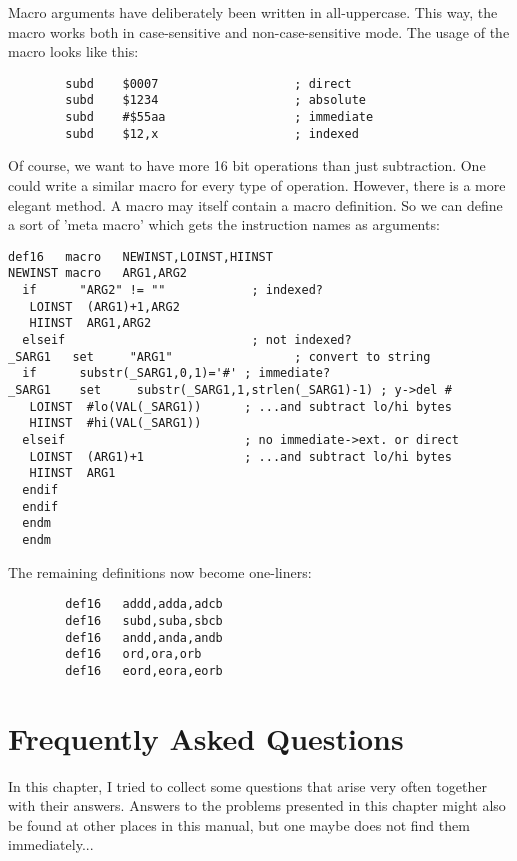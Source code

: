 \documentclass[12pt,twoside]{report}
\begin{document}
Macro arguments have deliberately been written in all-uppercase.  This way,
the macro works both in case-sensitive and non-case-sensitive mode.  The
usage of the macro looks like this:
\begin{verbatim}
        subd    $0007                   ; direct
        subd    $1234                   ; absolute
        subd    #$55aa                  ; immediate
        subd    $12,x                   ; indexed
\end{verbatim}
Of course, we want to have more 16 bit operations than just subtraction.  One
could write a similar macro for every type of operation. However, there is a
more elegant method.  A macro may itself contain a macro definition.  So we
can define a sort of 'meta macro' which gets the instruction names as arguments:
\begin{verbatim}
def16   macro   NEWINST,LOINST,HIINST
NEWINST macro   ARG1,ARG2
  if      "ARG2" != ""            ; indexed?
   LOINST  (ARG1)+1,ARG2
   HIINST  ARG1,ARG2
  elseif                          ; not indexed?
_SARG1   set     "ARG1"                 ; convert to string
  if      substr(_SARG1,0,1)='#' ; immediate?
_SARG1    set     substr(_SARG1,1,strlen(_SARG1)-1) ; y->del #
   LOINST  #lo(VAL(_SARG1))      ; ...and subtract lo/hi bytes
   HIINST  #hi(VAL(_SARG1))
  elseif                         ; no immediate->ext. or direct
   LOINST  (ARG1)+1              ; ...and subtract lo/hi bytes
   HIINST  ARG1
  endif
  endif
  endm
  endm
\end{verbatim}
The remaining definitions now become one-liners:
\begin{verbatim}
        def16   addd,adda,adcb
        def16   subd,suba,sbcb
        def16   andd,anda,andb
        def16   ord,ora,orb
        def16   eord,eora,eorb
\end{verbatim}



\cleardoublepage
\chapter{Frequently Asked Questions}

In this chapter, I tried to collect some questions that arise very often
together with their answers.  Answers to the problems presented in
this chapter might also be found at other places in this manual, but
one maybe does not find them immediately...
\end{document}
